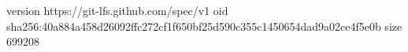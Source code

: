 version https://git-lfs.github.com/spec/v1
oid sha256:40a884a458d26092ffc272cf1f650bf25d590c355c1450654dad9a02ce4f5e0b
size 699208
